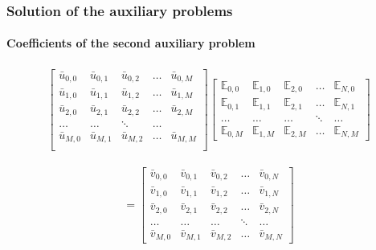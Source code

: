 \documentclass[aspectratio=169]{beamer}
\begin{document}
\begin{frame}
	\frametitle{Solution of the auxiliary problems}
	\framesubtitle{Coefficients of the second auxiliary problem}
	
	\begin{align*}
	\begin{bmatrix}
	\bar{u}_{0,0} & \bar{u}_{0,1} & \bar{u}_{0,2} & \ldots & \bar{u}_{0,M} \\
	\bar{u}_{1,0} & \bar{u}_{1,1} & \bar{u}_{1,2} & \ldots & \bar{u}_{1,M} \\
	\bar{u}_{2,0} & \bar{u}_{2,1} & \bar{u}_{2,2} & \ldots & \bar{u}_{2,M} \\
	\ldots & \ldots & \ddots & \ldots\\
	\bar{u}_{M,0} & \bar{u}_{M,1} & \bar{u}_{M,2} & \ldots & \bar{u}_{M,M} \\
	\end{bmatrix}
	\begin{bmatrix}
	\mathbb{E}_{0,0} & \mathbb{E}_{1,0} & \mathbb{E}_{2,0} & \ldots & \mathbb{E}_{N,0} \\
	\mathbb{E}_{0,1} & \mathbb{E}_{1,1} & \mathbb{E}_{2,1} & \ldots & \mathbb{E}_{N,1} \\
	\ldots & \ldots & \ldots & \ddots & \ldots \\
	\mathbb{E}_{0,M} & \mathbb{E}_{1,M} & \mathbb{E}_{2,M} & \ldots & \mathbb{E}_{N,M}
	\end{bmatrix}
	\end{align*}
	
	\begin{align*}	
	=
	\begin{bmatrix}
	\bar{v}_{0, 0} & \bar{v}_{0, 1} &\bar{v}_{0, 2} & \ldots & \bar{v}_{0, N} \\
	\bar{v}_{1, 0} & \bar{v}_{1, 1} &\bar{v}_{1, 2} & \ldots & \bar{v}_{1, N} \\
	\bar{v}_{2, 0} & \bar{v}_{2, 1} &\bar{v}_{2, 2} & \ldots & \bar{v}_{2, N} \\
	\ldots & \ldots & \ldots & \ddots & \ldots \\
	\bar{v}_{M, 0} & \bar{v}_{M, 1} &\bar{v}_{M, 2} & \ldots & \bar{v}_{M, N}
	\end{bmatrix}
	\end{align*}
\end{frame}
\end{document}

